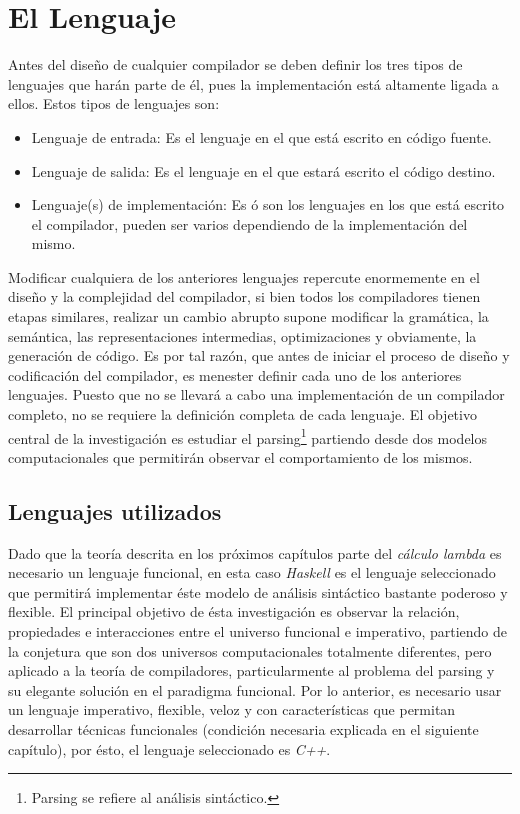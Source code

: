 
\chapter{El Lenguaje}


Antes del diseño de cualquier compilador se deben definir los tres tipos de lenguajes que harán parte de él, pues la implementación está altamente ligada a ellos. Estos tipos de lenguajes son:

\begin{itemize}
	\item Lenguaje de entrada: Es el lenguaje en el que está escrito en código fuente.
	\item Lenguaje de salida: Es el lenguaje en el que estará escrito el código destino.
	\item Lenguaje(s) de implementación: Es ó son los lenguajes en los que está escrito el compilador, pueden ser varios dependiendo de la implementación del mismo.
\end{itemize}

Modificar cualquiera de los anteriores lenguajes repercute enormemente en el diseño y la complejidad del compilador, si bien todos los compiladores tienen etapas similares, realizar un cambio abrupto supone modificar la gramática, la semántica, las representaciones intermedias, optimizaciones y obviamente, la generación de código.
Es por tal razón, que antes de iniciar el proceso de diseño y codificación del compilador, es menester definir cada uno de los anteriores lenguajes. Puesto que no se llevará a cabo una implementación de un compilador completo, no se requiere la definición completa de cada lenguaje. El objetivo central de la investigación es estudiar el parsing\footnote{Parsing se refiere al análisis sintáctico.} partiendo desde dos modelos computacionales que permitirán observar el comportamiento de los mismos.


\section{Lenguajes utilizados}
Dado que la teoría descrita en los próximos capítulos parte del \emph{cálculo lambda} es necesario un lenguaje funcional, en esta caso \emph{Haskell} es el lenguaje seleccionado que permitirá implementar éste modelo de análisis sintáctico bastante poderoso y flexible. El principal objetivo de ésta investigación es observar la relación, propiedades e interacciones entre el universo funcional e imperativo, partiendo de la conjetura que son dos universos computacionales totalmente diferentes, pero aplicado a la teoría de compiladores, particularmente al problema del parsing y su elegante solución en el paradigma funcional. Por lo anterior, es necesario usar un lenguaje imperativo, flexible, veloz y con características que permitan desarrollar técnicas funcionales (condición necesaria explicada en el siguiente capítulo), por ésto, el lenguaje seleccionado es \emph{C++}.

